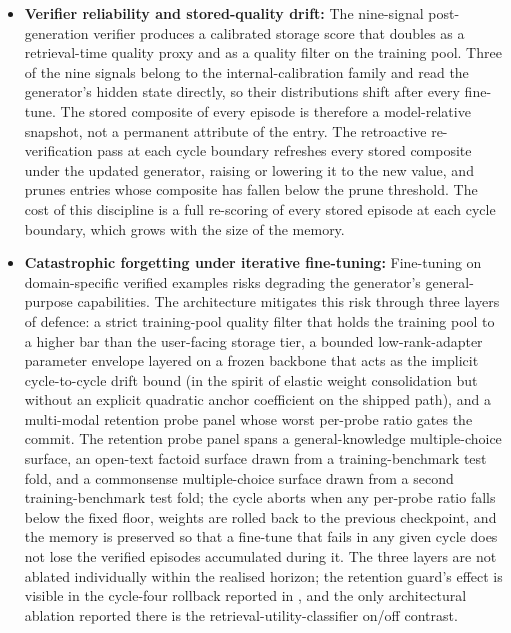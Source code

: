 \begin{itemize}
    \item \textbf{Verifier reliability and stored-quality drift:} The nine-signal post-generation verifier produces a calibrated storage score that doubles as a retrieval-time quality proxy and as a quality filter on the training pool. Three of the nine signals belong to the internal-calibration family and read the generator's hidden state directly, so their distributions shift after every fine-tune. The stored composite of every episode is therefore a model-relative snapshot, not a permanent attribute of the entry. The retroactive re-verification pass at each cycle boundary refreshes every stored composite under the updated generator, raising or lowering it to the new value, and prunes entries whose composite has fallen below the prune threshold. The cost of this discipline is a full re-scoring of every stored episode at each cycle boundary, which grows with the size of the memory.

    \item \textbf{Catastrophic forgetting under iterative fine-tuning:} Fine-tuning on domain-specific verified examples risks degrading the generator's general-purpose capabilities. The architecture mitigates this risk through three layers of defence: a strict training-pool quality filter that holds the training pool to a higher bar than the user-facing storage tier, a bounded low-rank-adapter parameter envelope layered on a frozen backbone that acts as the implicit cycle-to-cycle drift bound (in the spirit of elastic weight consolidation \cite{doi:10.1073/pnas.1611835114} but without an explicit quadratic anchor coefficient on the shipped path), and a multi-modal retention probe panel whose worst per-probe ratio gates the commit. The retention probe panel spans a general-knowledge multiple-choice surface, an open-text factoid surface drawn from a training-benchmark test fold, and a commonsense multiple-choice surface drawn from a second training-benchmark test fold; the cycle aborts when any per-probe ratio falls below the fixed floor, weights are rolled back to the previous checkpoint, and the memory is preserved so that a fine-tune that fails in any given cycle does not lose the verified episodes accumulated during it. The three layers are not ablated individually within the realised horizon; the retention guard's effect is visible in the cycle-four rollback reported in , and the only architectural ablation reported there is the retrieval-utility-classifier on/off contrast.


\end{itemize}
